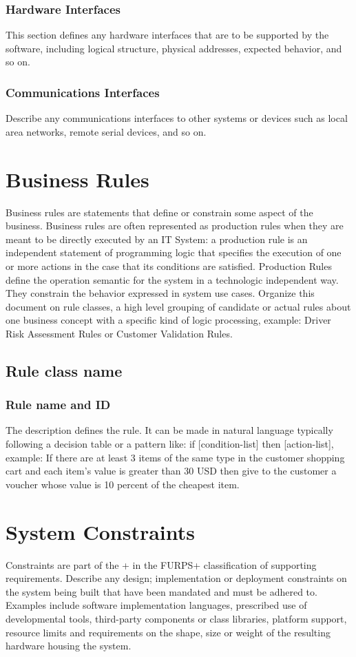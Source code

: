 \subsubsection{Hardware Interfaces}
This section defines any hardware interfaces that are to be supported by the software, including logical structure, physical addresses, expected behavior, and so on.

\subsubsection{Communications Interfaces}
Describe any communications interfaces to other systems or devices such as local area networks, remote serial devices, and so on.

\section{Business Rules}
Business rules are statements that define or constrain some aspect of the business. Business rules are often represented as production rules when they are meant to be directly executed by an IT System: a production rule is an independent statement of programming logic that specifies the execution of one or more actions in the case that its conditions are satisfied. Production Rules define the operation semantic for the system in a technologic independent way. They constrain the behavior expressed in system use cases.
Organize this document on rule classes, a high level grouping of candidate or actual rules about one business concept with a specific kind of logic processing, example: Driver Risk Assessment Rules or Customer Validation Rules.

\subsection{Rule class name}

\subsubsection{Rule name and ID}
The description defines the rule. It can be made in natural language typically following a decision table or a pattern like:  if [condition-list] then [action-list], example: 
If there are at least 3 items of the same type in the customer shopping cart and each item’s value is greater than 30 USD then give to the customer a voucher whose value is 10 percent of the cheapest item.

\section{System Constraints}
Constraints are part of the + in the FURPS+ classification of supporting requirements. Describe any design; implementation or deployment constraints on the system being built that have been mandated and must be adhered to. Examples include software implementation languages, prescribed use of developmental tools, third-party components or class libraries, platform support, resource limits and requirements on the shape, size or weight of the resulting hardware housing the system.


